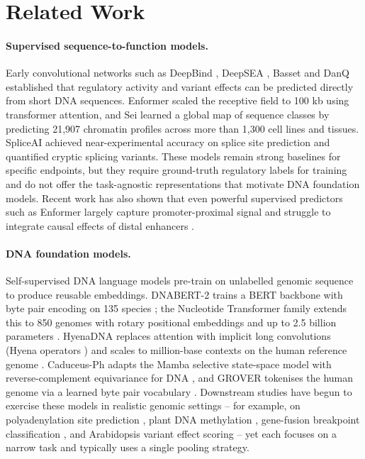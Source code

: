 \section{Related Work}

\paragraph{Supervised sequence-to-function models.}
Early convolutional networks such as DeepBind \citep{alipanahi2015deepbind}, DeepSEA \citep{zhou2015deepsea}, Basset \citep{kelley2016basset} and DanQ \citep{quang2016danq} established that regulatory activity and variant effects can be predicted directly from short DNA sequences. Enformer \citep{avsec2021enformer} scaled the receptive field to 100 kb using transformer attention, and Sei \citep{chen2022sei} learned a global map of sequence classes by predicting 21{,}907 chromatin profiles across more than 1{,}300 cell lines and tissues. SpliceAI \citep{jaganathan2019spliceai} achieved near-experimental accuracy on splice site prediction and quantified cryptic splicing variants. These models remain strong baselines for specific endpoints, but they require ground-truth regulatory labels for training and do not offer the task-agnostic representations that motivate DNA foundation models. Recent work has also shown that even powerful supervised predictors such as Enformer largely capture promoter-proximal signal and struggle to integrate causal effects of distal enhancers \citep{karollus2023enformer_limits}.

\paragraph{DNA foundation models.}
Self-supervised DNA language models pre-train on unlabelled genomic sequence to produce reusable embeddings. DNABERT-2 trains a BERT backbone with byte pair encoding on 135 species \citep{zhou2024dnabert2}; the Nucleotide Transformer family extends this to 850 genomes with rotary positional embeddings and up to 2.5 billion parameters \citep{dallatorre2025nt}. HyenaDNA replaces attention with implicit long convolutions (Hyena operators \citep{poli2023hyena}) and scales to million-base contexts on the human reference genome \citep{nguyen2023hyenadna}. Caduceus-Ph adapts the Mamba selective state-space model \citep{gu2023mamba} with reverse-complement equivariance for DNA \citep{schiff2024caduceus}, and GROVER tokenises the human genome via a learned byte pair vocabulary \citep{sanabria2024grover}. Downstream studies have begun to exercise these models in realistic genomic settings -- for example, on polyadenylation site prediction \citep{saha2025polya_glm}, plant DNA methylation \citep{feng2025hyenadna_methylation}, gene-fusion breakpoint classification \citep{krupicka2026fusion}, and Arabidopsis variant effect scoring \citep{benegas2023gpn} -- yet each focuses on a narrow task and typically uses a single pooling strategy.


